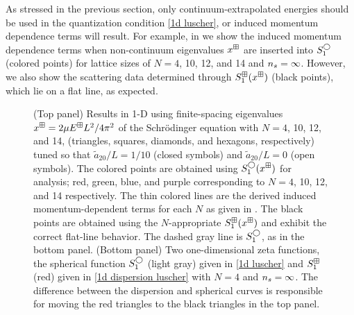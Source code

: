 As stressed in the previous section, only continuum-extrapolated energies should be used in the quantization condition \eqref{1d luscher}, or induced momentum dependence terms will result.
For example, in  we show the induced momentum dependence terms when non-continuum eigenvalues $x^\boxplus$ are inserted into $S^{\bigcirc}_1$ (colored points) for lattice sizes of $N=4$, 10, 12, and 14 and ${n_s}=\infty$.
However, we also show the scattering data determined through $S^{\boxplus}_1(x^\boxplus)$ (black points), which lie on a flat line, as expected.

\begin{figure}
\center
    \center
    
    \caption{
        (Top panel)
        Results in 1-D using finite-spacing eigenvalues $x^\boxplus=2\mu E^\boxplus L^2/4\pi^2$ of the Schr\"odinger equation with $N=4$, 10, 12, and 14, (triangles, squares, diamonds, and hexagons, respectively) tuned so that $\tilde a_{20}/L=1/10$ (closed symbols) and $\tilde a_{20}/L=0$ (open symbols).
        The colored points are obtained using $S^\bigcirc_1(x^\boxplus)$ for analysis; red, green, blue, and purple corresponding to $N=4$, 10, 12, and 14 respectively.
        The thin colored lines are the derived induced momentum-dependent terms for each $N$ as given in .
        The black points are obtained using the $N$-appropriate $S^{\boxplus}_1(x^\boxplus)$ and exhibit the correct flat-line behavior.
        The dashed gray line is $S_1^\bigcirc$, as in the bottom panel.
        (Bottom panel)
        Two one-dimensional zeta functions, the spherical function $S_1^{\bigcirc}$ (light gray) given in \eqref{1d luscher} and $S_1^{\boxplus}$ (red) given in \eqref{1d dispersion luscher} with $N=4$ and ${n_s}=\infty$.
        The difference between the dispersion and spherical curves is responsible for moving the red triangles to the black triangles in the top panel.
        }
        \label{fig:luescher1d}
\end{figure}

